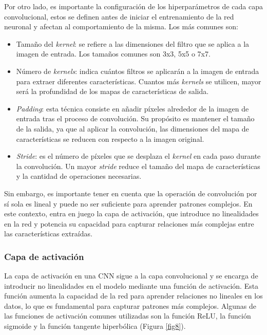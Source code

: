 Por otro lado, es importante la configuración de los hiperparámetros de cada capa convolucional, estos se definen antes de iniciar el entrenamiento de la red neuronal y afectan al comportamiento de la misma. Los más comunes son:
\begin{itemize}
	\item Tamaño del \textit{kernel}: se refiere a las dimensiones del filtro que se aplica a la imagen de entrada. Los tamaños comunes son 3x3, 5x5 o 7x7.
	\item Número de \textit{kernels}: indica cuántos filtros se aplicarán a la imagen de entrada para extraer diferentes características. Cuantos más \textit{kernels} se utilicen, mayor será la profundidad de los mapas de características de salida.
	\item \textit{Padding}: esta técnica consiste en añadir píxeles alrededor de la imagen de entrada tras el proceso de convolución. Su propósito es mantener el tamaño de la salida, ya que al aplicar la convolución, las dimensiones del mapa de características se reducen con respecto a la imagen original.
	\item \textit{Stride}: es el número de píxeles que se desplaza el \textit{kernel} en cada paso durante la convolución. Un mayor \textit{stride} reduce el tamaño del mapa de características y la cantidad de operaciones necesarias.
\end{itemize}

Sin embargo, es importante tener en cuenta que la operación de convolución por sí sola es lineal y puede no ser suficiente para aprender patrones complejos. En este contexto, entra en juego la capa de activación, que introduce no linealidades en la red y potencia su capacidad para capturar relaciones más complejas entre las características extraídas.

\subsubsection*{Capa de activación}

La capa de activación en una CNN sigue a la capa convolucional y se encarga de introducir no linealidades en el modelo mediante una función de activación.
Esta función aumenta la capacidad de la red para aprender relaciones no lineales en los datos, lo que es fundamental para capturar patrones más complejos. Algunas de las funciones de activación comunes utilizadas son la función ReLU, la función sigmoide y la función tangente hiperbólica (Figura \ref{fig8}).

